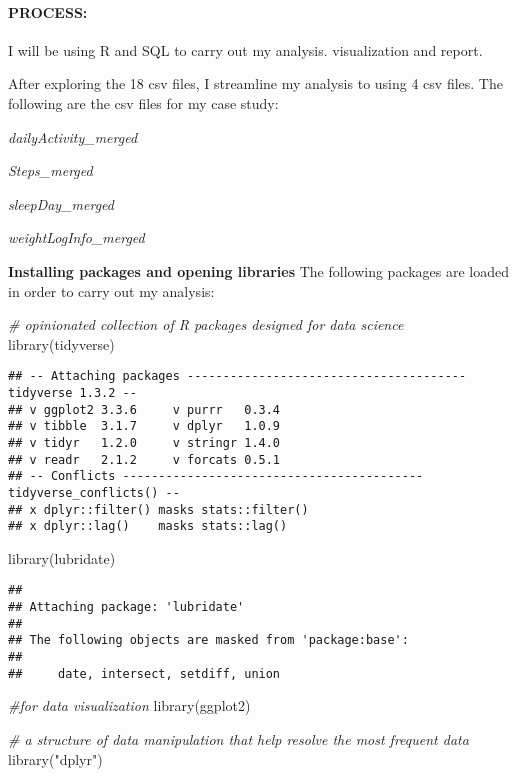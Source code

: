 \documentclass[
]{article}
\newenvironment{Shaded}{\begin{snugshade}}{\end{snugshade}}
\newcommand{\CommentTok}[1]{\textcolor[rgb]{0.56,0.35,0.01}{\textit{#1}}}
\newcommand{\FunctionTok}[1]{\textcolor[rgb]{0.00,0.00,0.00}{#1}}
\newcommand{\NormalTok}[1]{#1}
\newcommand{\StringTok}[1]{\textcolor[rgb]{0.31,0.60,0.02}{#1}}
\begin{document}
\hypertarget{process}{%
\paragraph{\texorpdfstring{\textbf{PROCESS:}}{PROCESS:}}\label{process}}

I will be using R and SQL to carry out my analysis. visualization and
report.

After exploring the 18 csv files, I streamline my analysis to using 4
csv files. The following are the csv files for my case study:

\emph{dailyActivity\_merged}

\emph{Steps\_merged}

\emph{sleepDay\_merged}

\emph{weightLogInfo\_merged}

\textbf{Installing packages and opening libraries} The following
packages are loaded in order to carry out my analysis:

\begin{Shaded}
\begin{Highlighting}[]
\CommentTok{\# opinionated collection of R packages designed for data science}
\FunctionTok{library}\NormalTok{(tidyverse)}
\end{Highlighting}
\end{Shaded}

\begin{verbatim}
## -- Attaching packages --------------------------------------- tidyverse 1.3.2 --
## v ggplot2 3.3.6     v purrr   0.3.4
## v tibble  3.1.7     v dplyr   1.0.9
## v tidyr   1.2.0     v stringr 1.4.0
## v readr   2.1.2     v forcats 0.5.1
## -- Conflicts ------------------------------------------ tidyverse_conflicts() --
## x dplyr::filter() masks stats::filter()
## x dplyr::lag()    masks stats::lag()
\end{verbatim}

\begin{Shaded}
\begin{Highlighting}[]
\FunctionTok{library}\NormalTok{(lubridate)}
\end{Highlighting}
\end{Shaded}

\begin{verbatim}
## 
## Attaching package: 'lubridate'
## 
## The following objects are masked from 'package:base':
## 
##     date, intersect, setdiff, union
\end{verbatim}

\begin{Shaded}
\begin{Highlighting}[]
 \CommentTok{\#for data visualization}
\FunctionTok{library}\NormalTok{(ggplot2)    }

\CommentTok{\# a structure of data manipulation that help resolve the most frequent data}
\FunctionTok{library}\NormalTok{(}\StringTok{"dplyr"}\NormalTok{)}
\end{Highlighting}
\end{Shaded}
\end{document}
